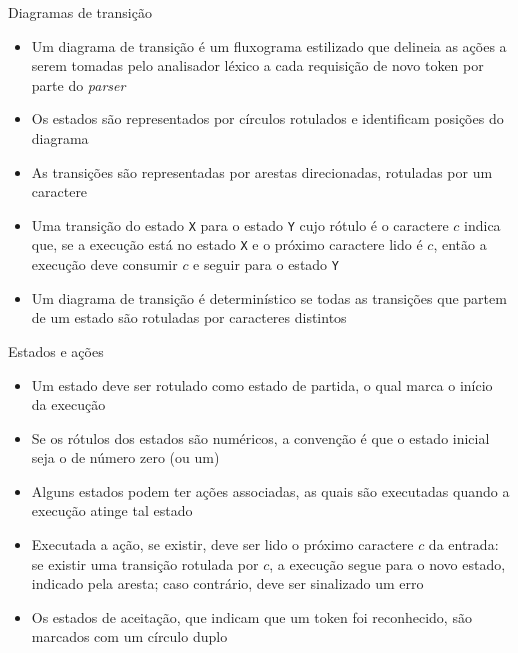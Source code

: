 \begin{frame}[fragile]{Diagramas de transição}

    \begin{itemize}
        \item Um diagrama de transição é um fluxograma estilizado que delineia as ações a serem tomadas pelo analisador léxico a cada requisição de novo token
            por parte do \textit{parser}

        \item Os estados são representados por círculos rotulados e identificam posições do diagrama 

        \item As transições são representadas por arestas direcionadas, rotuladas por um caractere

        \item Uma transição do estado \texttt{X} para o estado \texttt{Y} cujo rótulo é o caractere $c$ indica que, se a execução está no estado \texttt{X} e
            o próximo caractere lido é $c$, então a execução deve consumir $c$ e seguir para o estado \texttt{Y}

        \item Um diagrama de transição é determinístico se todas as transições que partem de um estado são rotuladas por caracteres distintos
    \end{itemize}

\end{frame}

\begin{frame}[fragile]{Estados e ações}

    \begin{itemize}
        \item Um estado deve ser rotulado como estado de partida, o qual marca o início da execução

        \item Se os rótulos dos estados são numéricos, a convenção é que o estado inicial seja o de número zero (ou um)

        \item Alguns estados podem ter ações associadas, as quais são executadas quando a execução atinge tal estado

        \item Executada a ação, se existir, deve ser lido o próximo caractere $c$ da entrada: se existir uma transição rotulada por $c$, a execução segue
            para o novo estado, indicado pela aresta; caso contrário, deve ser sinalizado um erro

        \item Os estados de aceitação, que indicam que um token foi reconhecido, são marcados com um círculo duplo
    \end{itemize}

\end{frame}

